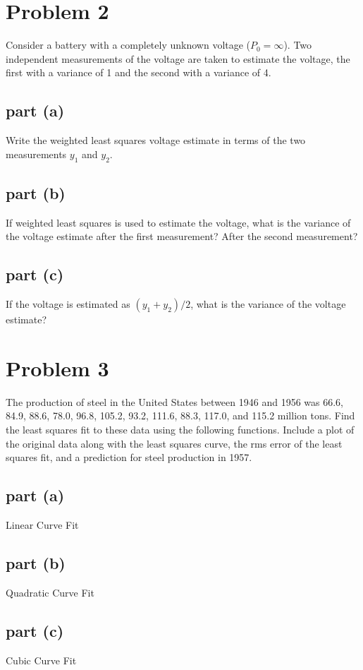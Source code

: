 \documentclass[11pt]{article}
\begin{document}
\section*{Problem 2}
Consider a battery with a completely unknown voltage ($P_0=\infty$). Two independent measurements of the voltage are taken to estimate the voltage, the first with a variance of 1 and the second with a variance of 4.

\subsection*{part (a)}
Write the weighted least squares voltage estimate in terms of the two measurements $y_1$ and $y_2$.

\subsection*{part (b)}
If weighted least squares is used to estimate the voltage, what is the variance of the voltage estimate after the first measurement? After the second measurement?

\subsection*{part (c)}
If the voltage is estimated as $(y_1+y_2)/2$, what is the variance of the voltage estimate?

\section*{Problem 3}
The production of steel in the United States between 1946 and 1956 was 66.6, 84.9, 88.6, 78.0, 96.8, 105.2, 93.2, 111.6, 88.3, 117.0, and 115.2 million tons. Find the least squares fit to these data using the following functions. Include a plot of the original data along with the least squares curve, the rms error of the least squares fit, and a prediction for steel production in 1957.

\subsection*{part (a)}
Linear Curve Fit

\subsection*{part (b)}
Quadratic Curve Fit

\subsection*{part (c)}
Cubic Curve Fit
\end{document}
